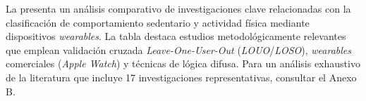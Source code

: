 
La  presenta un análisis comparativo de investigaciones clave relacionadas con la clasificación de comportamiento sedentario y actividad física mediante dispositivos \textit{wearables}. La tabla destaca estudios metodológicamente relevantes que emplean validación cruzada \textit{Leave-One-User-Out} (\textit{LOUO}/\textit{LOSO}), \textit{wearables} comerciales (\textit{Apple Watch}) y técnicas de lógica difusa. Para un análisis exhaustivo de la literatura que incluye 17 investigaciones representativas, consultar el Anexo B.

\begingroup
\setlength{\tabcolsep}{4pt}
\renewcommand{\arraystretch}{1.15}
\fontsize{12}{14.4}\selectfont
